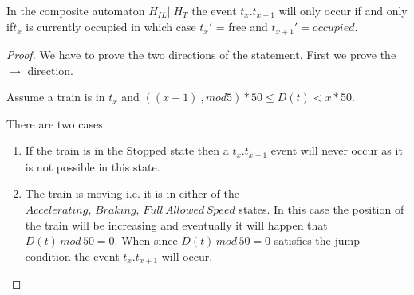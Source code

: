 \begin{mytheorem}

In the composite automaton $H_{IL}|| H_{T} $  the event $t_x.t_{x+1}$ will only occur if  and only if$t_x$ is currently occupied in which case $t_x'$ = free and $t_{x+1}' = occupied$.


\begin{proof}
We have to prove the two directions of the statement. First we prove the $\to$ direction.




Assume a train is in $t_x$ and $((x-1) \ ,mod 5) * 50 \leq D(t) < x *50$.

There are two cases
\begin{enumerate}
\item If the train is in the Stopped state then a $t_{x}.t_{x+1}$ event will never occur as it is not possible in this state.

\item The train is moving i.e. it is in either of the $Accelerating, \, Braking , \,  Full \, Allowed \, Speed$ states. In this case the position of the train will be increasing and eventually it will happen that $D(t) \,  mod \, 50 = 0$. When since $D(t) \, mod \, 50 = 0$  satisfies the jump condition the event
 $t_{x}.t_{x+ 1}$ will occur.  
 

\end{enumerate}
\end{proof}
\end{mytheorem}
